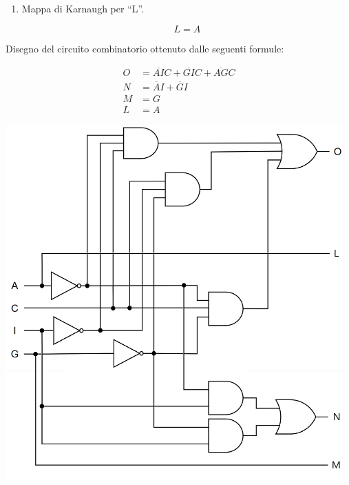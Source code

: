 \begin{questions}
\begin{solution}
\begin{enumerate}
				\vspace{1.5em}
          						
                \item Mappa di Karnaugh per ``L''.
                
                 \begin{center}
                    	\begin{karnaugh-map}[4][4][1][$IC$][$AG$ ]
                    	\end{karnaugh-map}
                 \end{center}
                 \[ L = A \]                     
            \end{enumerate}
            
            \newpage
            
            Disegno del circuito combinatorio ottenuto dalle seguenti formule:
            
            \begin{align*}
            	O &= \overline{AI}C +  \overline{GI}C + \overline{AG}C\\
            	N &= \overline{A}I + \overline{G}I\\
            	M &= G \\
            	L &= A
            \end{align*}
            
            \begin{center}               	
                \includegraphics[width=13cm, keepaspectratio]{img/circuito_finale.png}
            \end{center}
            

\end{solution}
\end{questions}
